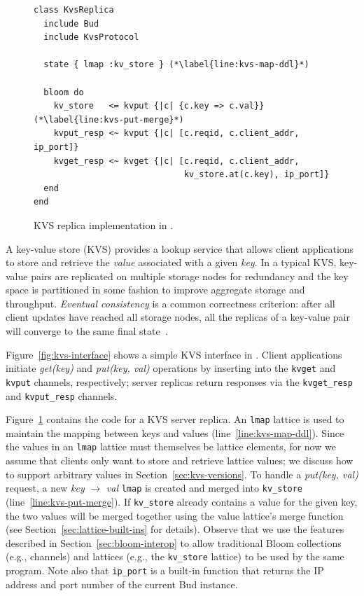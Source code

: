 \begin{figure}[t]
\begin{scriptsize}
\begin{lstlisting}
class KvsReplica
  include Bud
  include KvsProtocol

  state { lmap :kv_store } (*\label{line:kvs-map-ddl}*)

  bloom do
    kv_store   <= kvput {|c| {c.key => c.val}} (*\label{line:kvs-put-merge}*)
    kvput_resp <~ kvput {|c| [c.reqid, c.client_addr, ip_port]}
    kvget_resp <~ kvget {|c| [c.reqid, c.client_addr,
                              kv_store.at(c.key), ip_port]}
  end
end
\end{lstlisting}
\end{scriptsize}
\caption{KVS replica implementation in \lang.}
\label{fig:kvs-replica}
\end{figure}

A key-value store (KVS) provides a lookup service that allows client
applications to store and retrieve the \emph{value} associated with a given
\emph{key}. In a typical KVS, key-value pairs are replicated on multiple storage
nodes for redundancy and the key space is partitioned in some fashion to improve
aggregate storage and throughput. \emph{Eventual consistency} is a common
correctness criterion: after all client updates have reached all storage nodes,
all the replicas of a key-value pair will converge to the same final
state~\cite{Terry1995,vogels}.

Figure~\ref{fig:kvs-interface} shows a simple KVS interface in \lang. Client
applications initiate \emph{get(key)} and \emph{put(key, val)} operations by
inserting into the \texttt{kvget} and \texttt{kvput} channels, respectively;
server replicas return responses via the \texttt{kvget\_resp} and
\texttt{kvput\_resp} channels.

Figure~\ref{fig:kvs-replica} contains the \lang code for a KVS server
replica. An \texttt{lmap} lattice is used to maintain the mapping between keys
and values (line~\ref{line:kvs-map-ddl}). Since the values in an \texttt{lmap}
lattice must themselves be lattice elements, for now we assume that clients only
want to store and retrieve lattice values; we discuss how to support arbitrary
values in Section~\ref{sec:kvs-versions}. To handle a \emph{put(key, val)}
request, a new \emph{key} $\to$ \emph{val} \texttt{lmap} is created and merged
into \texttt{kv\_store} (line~\ref{line:kvs-put-merge}). If \texttt{kv\_store}
already contains a value for the given key, the two values will be merged
together using the value lattice's merge function (see
Section~\ref{sec:lattice-built-ins} for details). Observe that we use the \lang
features described in Section~\ref{sec:bloom-interop} to allow traditional Bloom
collections (e.g., channels) and lattices (e.g., the \texttt{kv\_store} lattice)
to be used by the same program. Note also that \texttt{ip\_port} is a built-in
function that returns the IP address and port number of the current Bud
instance.

